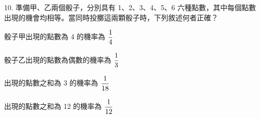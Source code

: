 \documentclass[12pt]{article}
\begin{document}
\begin{problem}[widest=10]
  \item[10.] 準備甲、乙兩個骰子，分別具有 1、2、3、4、5、6 六種點數，其中每個點數出現的機會均相等。當同時投擲這兩顆骰子時，下列敘述何者正確？
  \begin{choices}
    \item 骰子甲出現的點數為 4 的機率為 $\fraction{1}{4}$
    \item 骰子乙出現的點數為偶數的機率為 $\fraction{1}{3}$
    \item 出現的點數之和為 3 的機率為 $\fraction{1}{18}$
    \item 出現的點數之和為 12 的機率為 $\fraction{1}{12}$
  \end{choices}
\end{problem}
\end{document}
